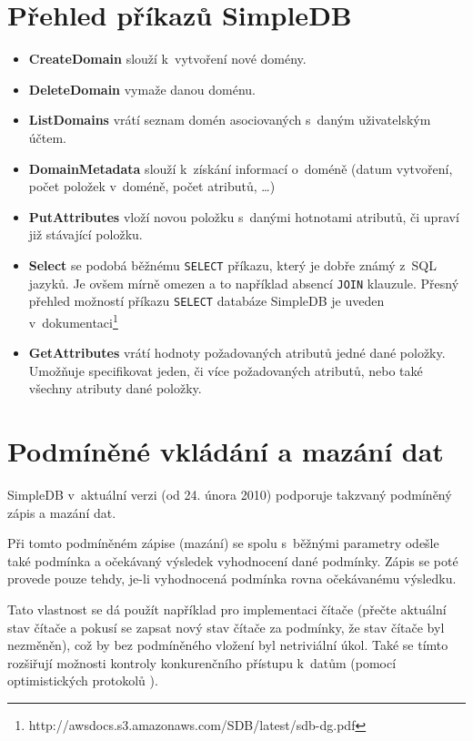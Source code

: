 \documentclass[oneside,12pt]{fithesis2}
\begin{document}
\section{Přehled příkazů SimpleDB}
\begin{itemize}
 \item \textbf{CreateDomain} slouží k~vytvoření nové domény.
 \item \textbf{DeleteDomain} vymaže danou doménu.
 \item \textbf{ListDomains} vrátí seznam domén asociovaných s~daným uživatelským účtem.
 \item \textbf{DomainMetadata} slouží k~získání informací o~doméně (datum vytvoření, počet položek v~doméně, počet atributů, \dots)
 \item \textbf{PutAttributes} vloží novou položku s~danými hotnotami atributů, či upraví již stávající položku.
 \item \textbf{Select} se podobá běžnému \verb<SELECT< příkazu, který je dobře známý z~SQL jazyků. Je ovšem mírně omezen a to například absencí \verb<JOIN< klauzule. Přesný přehled možností příkazu \verb<SELECT< databáze SimpleDB je uveden v~dokumentaci\footnote{http://awsdocs.s3.amazonaws.com/SDB/latest/sdb-dg.pdf}
 \item \textbf{GetAttributes} vrátí hodnoty požadovaných atributů jedné dané položky. Umožňuje specifikovat jeden, či více požadovaných atributů, nebo také všechny atributy dané položky.
\end{itemize}

\section{Podmíněné vkládání a mazání dat}
SimpleDB v~aktuální verzi (od 24. února 2010) podporuje takzvaný podmíněný zápis a mazání dat. 

Při tomto podmíněném zápise (mazání) se spolu s~běžnými parametry odešle také podmínka a očekávaný výsledek vyhodnocení dané podmínky. Zápis se poté provede pouze tehdy, je-li vyhodnocená podmínka rovna očekávanému výsledku.

Tato vlastnost se dá použít například pro implementaci čítače (přečte aktuální stav čítače a pokusí se zapsat nový stav čítače za podmínky, že stav čítače byl nezměněn), což by bez podmíněného vložení byl netriviální úkol. Také se tímto rozšiřují možnosti kontroly konkurenčního přístupu k~datům (pomocí optimistických protokolů ).
\end{document}

